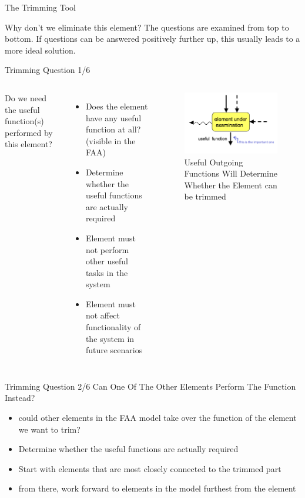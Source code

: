 \documentclass{beamer}
\begin{document}
	
	\begin{frame}{The Trimming Tool}
		\begin{block}{Why don’t we eliminate this element?}
			The questions are examined from top to bottom. If questions can be answered positively further up, this usually leads to a more ideal solution.
		\end{block}
	\end{frame}
	
	
	\begin{frame}{Trimming Question 1/6}
		\begin{columns}
		Do we need the useful function(s) performed by this element?
		\begin{itemize}
			\item Does the element have any useful function at all? (visible in the FAA)
			\item Determine whether the useful functions are actually required
			\item Element must not perform other useful tasks in the system
			\item Element must not affect functionality of the system in future scenarios
		\end{itemize}
			\begin{figure}
				\centering
				\includegraphics[width=1.1\textwidth]{img/q1.png}
				\caption{Useful Outgoing Functions Will Determine Whether the Element can be trimmed}
			\end{figure}	
		\end{columns}
	\end{frame}
	
	\begin{frame}{Trimming Question 2/6}
		Can One Of The Other Elements Perform The Function Instead?
		\begin{itemize}
			\item could other elements in the FAA model take over the function of the element we want to trim?
			\item Determine whether the useful functions are actually required
			\item Start with elements that are most closely connected to the trimmed part
			\item from there, work forward to elements in the model furthest from the element
		\end{itemize}
	\end{frame}
	
\end{document}
